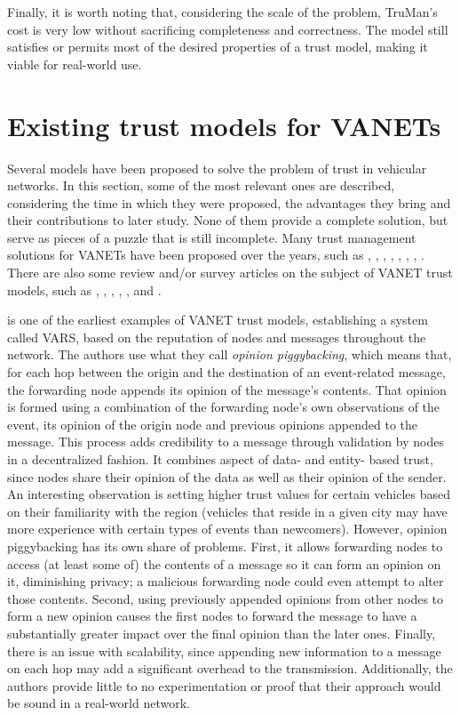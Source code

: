 Finally, it is worth noting that, considering the scale of the problem, TruMan's cost is very low without sacrificing completeness and correctness.
The model still satisfies or permits most of the desired properties of a trust model, making it viable for real-world use.

\section{Existing trust models for VANETs}
 
Several models have been proposed to solve the problem of trust in vehicular networks. 
In this section, some of the most relevant ones are described, considering the time in which they were proposed, the advantages they bring and their contributions to later study. 
None of them provide a complete solution, but serve as pieces of a puzzle that is still incomplete. 
Many trust management solutions for VANETs have been proposed over the years, such as \cite{patwardhan2006data}, \cite{gerlach2007trust}, \cite{raya2008data}, \cite{huang2010situation}, \cite{ding2013novel}, \cite{haddadou2013trust}, \cite{liu2016lsot}, \cite{kerrache2016detection}.
There are also some review and/or survey articles on the subject of VANET trust models, such as \cite{zhang2011survey}, \cite{ma2011survey}, \cite{zhang2012trust}, \cite{mejri2014survey}, \cite{soleymani2015trust} \cite{sengar2016survey}, and \cite{dwivedi2016review}. 

\cite{dotzer2005vars} is one of the earliest examples of VANET trust models, establishing a system called VARS, based on the reputation of nodes and messages throughout the network.
The authors use what they call \textit{opinion piggybacking}, which means that, for each hop between the origin and the destination of an event-related message, the forwarding node appends its opinion of the message's contents.
That opinion is formed using a combination of the forwarding node's own observations of the event, its opinion of the origin node and previous opinions appended to the message.
This process adds credibility to a message through validation by nodes in a decentralized fashion.
It combines aspect of data- and entity- based trust, since nodes share their opinion of the data as well as their opinion of the sender. 
An interesting observation is setting higher trust values for certain vehicles based on their familiarity with the region (vehicles that reside in a given city may have more experience with certain types of events than newcomers).
However, opinion piggybacking has its own share of problems.
First, it allows forwarding nodes to access (at least some of) the contents of a message so it can form an opinion on it, diminishing privacy; a malicious forwarding node could even attempt to alter those contents.
Second, using previously appended opinions from other nodes to form a new opinion causes the first nodes to forward the message to have a substantially greater impact over the final opinion than the later ones.
Finally, there is an issue with scalability, since appending new information to a message on each hop may add a significant overhead to the transmission. Additionally, the authors provide little to no experimentation or proof that their approach would be sound in a real-world network.

